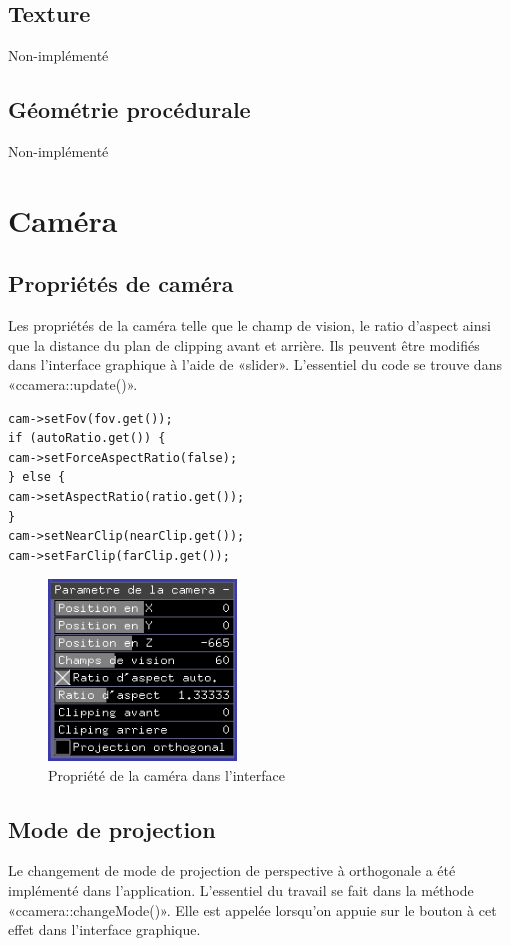 \subsection{Texture}
Non-implémenté

\subsection{Géométrie procédurale}
Non-implémenté

\pagebreak
\section{Caméra}
\subsection{Propriétés de caméra}
Les propriétés de la caméra telle que le champ de vision, le ratio d'aspect ainsi que la distance du plan de clipping avant et arrière. Ils peuvent être modifiés dans l'interface graphique à l'aide de «slider». L'essentiel du code se trouve dans «ccamera::update()».


\begin{lstlisting}
cam->setFov(fov.get());
if (autoRatio.get()) {
cam->setForceAspectRatio(false);
} else {
cam->setAspectRatio(ratio.get());
}
cam->setNearClip(nearClip.get());
cam->setFarClip(farClip.get());
\end{lstlisting}

\begin{figure}[h]
	\centering
	\includegraphics[width=5cm]{fig/proprieteCamera.png}
	\caption{Propriété de la caméra dans l'interface}
	\label{fig:propriete}
\end{figure}

\subsection{Mode de projection}
Le changement de mode de projection de perspective à orthogonale a été implémenté dans l'application. L'essentiel du travail se fait dans la méthode «ccamera::changeMode()». Elle est appelée lorsqu'on appuie sur le bouton à cet effet dans l'interface graphique.

